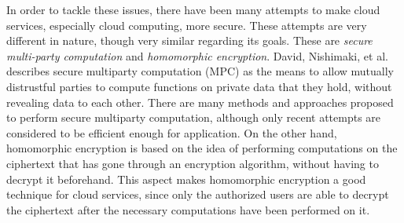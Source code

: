 In order to tackle these issues, there have been many attempts to make cloud services, especially cloud computing, more secure. These attempts are very different in nature, though very similar regarding its goals. These are \emph{secure multi-party computation} and \emph{homomorphic encryption}. David, Nishimaki, et al. \cite{cryptoeprint:2015:135} describes secure multiparty computation (MPC) as the means to allow mutually distrustful parties to compute functions on private data that they hold, without revealing data to each other. There are many methods and approaches proposed to perform secure multiparty computation, although only recent attempts are considered to be efficient enough for application. On the other hand, homomorphic encryption is based on the idea of performing computations on the ciphertext that has gone through an encryption algorithm, without having to decrypt it beforehand. This aspect makes homomorphic encryption a good technique for cloud services, since only the authorized users are able to decrypt the ciphertext after the necessary computations have been performed on it.


\clearpage
